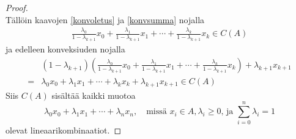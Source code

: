 \documentclass[12pt,a4paper,leqno]{report}
\theoremstyle{plain}
\theoremstyle{definition}
\theoremstyle{remark}
\begin{document}
\begin{proof}
\begin{equation}
\end{equation}
Tällöin kaavojen \ref{konvoletus} ja \ref{konvsumma} nojalla
\begin{equation*}
\begin{split}
\frac{ \lambda_0}{1-\lambda_{k+1}} x_0+\frac{ \lambda_1}{1-\lambda_{k+1}} x_1+\cdots+\frac{ \lambda_k}{1-\lambda_{k+1}} x_{k}\in C(A)
\end{split}
\end{equation*}
ja edelleen konveksiuden nojalla
\begin{equation*}
\begin{split}
&(1-\lambda_{k+1})\left(\frac{ \lambda_0}{1-\lambda_{k+1}} x_0+\frac{ \lambda_1}{1-\lambda_{k+1}} x_1+\cdots+\frac{ \lambda_k}{1-\lambda_{k+1}} x_{k}\right) +\lambda_{k+1} x_{k+1}\\
=&\lambda_0 x_0+\lambda_1 x_1+\cdots+\lambda_{k} x_{k}+\lambda_{k+1} x_{k+1}\in C(A)
\end{split}
\end{equation*}
%
%
%
%
Siis $C(A)$ sisältää kaikki muotoa%
\begin{equation*}
\lambda_0 x_0+\lambda_1 x_1+\cdots+\lambda_{n} x_{n},
\quad\text{missä } x_i\in A, \lambda_i\geq0\text{, ja }
\sum_{i=0}^{n}{\lambda_i}=1
\end{equation*} 
olevat lineaarikombinaatiot.
%
%
%


\end{proof}
\end{document}
